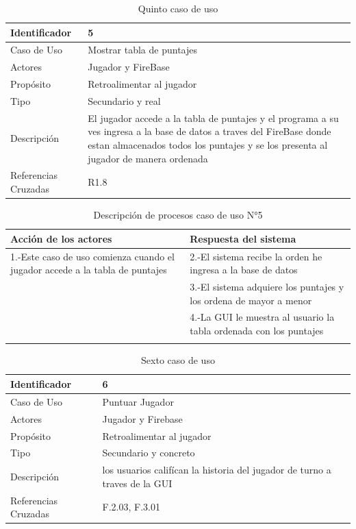 \begin{table}[H]
    \begin{center}
        \begin{tabular}{| l | m{12cm} |}        
        	\hline 
        	Identificador & 5\\
        	\hline
        	Caso de Uso & Mostrar tabla de puntajes\\
        	\hline
        	Actores & Jugador y FireBase\\
        	\hline
        	Propósito & Retroalimentar al jugador\\
        	\hline
        	Tipo & Secundario y real\\
        	\hline
        	Descripción & El jugador accede a la tabla de puntajes y el programa a su ves ingresa a la base de datos a traves del FireBase donde estan almacenados todos los puntajes y se los presenta al jugador de manera ordenada\\
        	\hline
        	Referencias Cruzadas & R1.8\\
        	\hline
        \end{tabular}
    \caption{Quinto caso de uso}
    \label{Caso_de_uso_5}
    \end{center}
\end{table}

\begin{longtable}[H]{| m{8cm} | m{8cm} |}
\hline 
\textbf{Acción de los actores} & \textbf{Respuesta del sistema}\\
\hline 
1.-Este caso de uso comienza cuando el jugador accede a la tabla de puntajes & 2.-El sistema recibe la orden he ingresa a la base de datos\\
\hline
& 3.-El sistema adquiere los puntajes y los ordena de mayor a menor\\
\hline
& 4.-La GUI le muestra al usuario la tabla ordenada con los puntajes\\
\hline
\caption{Descripción de procesos caso de uso N°5}
\end{longtable}

\begin{table}[H]
    \begin{center}
        \begin{tabular}{| l | m{12cm} |}        
        	\hline 
        	Identificador & 6\\
        	\hline
        	Caso de Uso & Puntuar Jugador\\
        	\hline
        	Actores & Jugador y Firebase\\
        	\hline
        	Propósito & Retroalimentar al jugador\\
        	\hline
        	Tipo & Secundario y concreto\\
        	\hline
        	Descripción & los usuarios califícan la historia del jugador de turno a traves de la GUI\\
        	\hline
        	Referencias Cruzadas & F.2.03, F.3.01\\
        	\hline
        \end{tabular}
    \caption{Sexto caso de uso}
    \label{Caso_de_uso_6}
    \end{center}
\end{table}

